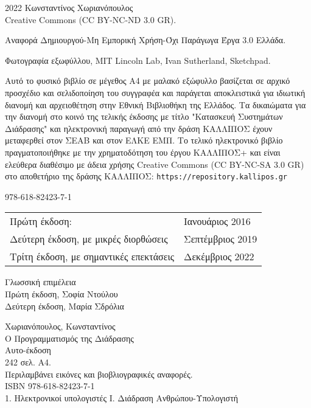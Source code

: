 \thispagestyle{empty}
\begingroup
\footnotesize
\parindent 0pt
\parskip \baselineskip
\textcopyright{} 2022 Κωνσταντίνος Χωριανόπουλος\\
Creative Commons (CC BY-NC-ND 3.0 GR).

Αναφορά Δημιουργού-Μη Εμπορική Χρήση-Όχι Παράγωγα Έργα 3.0 Ελλάδα. 

Φωτογραφία εξωφύλλου, MIT Lincoln Lab, Ivan Sutherland, Sketchpad.

\vfill

Αυτό το φυσικό βιβλίο σε μέγεθος Α4 με μαλακό εξώφυλλο βασίζεται σε αρχικό προσχέδιο και σελιδοποίηση του συγγραφέα και παράγεται αποκλειστικά για ιδιωτική διανομή και αρχειοθέτηση στην Εθνική Βιβλιοθήκη της Ελλάδος. Τα δικαιώματα για την διανομή στο κοινό της τελικής έκδοσης με τίτλο "Κατασκευή Συστημάτων Διάδρασης" και ηλεκτρονική παραγωγή από την δράση ΚΑΛΛΙΠΟΣ έχουν μεταφερθεί στον ΣΕΑΒ και στον ΕΛΚΕ ΕΜΠ. Το τελικό ηλεκτρονικό βιβλίο πραγματοποιήθηκε με την χρηματοδότηση του έργου ΚΑΛΛΙΠΟΣ+ και είναι ελεύθερα διαθέσιμο με άδεια χρήσης Creative Commons (CC BY-NC-SA 3.0 GR) στο αποθετήριο της δράσης ΚΑΛΛΙΠΟΣ: \texttt{https://repository.kallipos.gr} 

\vfill

\begin{center}
978-618-82423-7-1
\end{center}

\begin{center}
\begin{tabular}{ll}
Πρώτη έκδοση: & Ιανουάριος 2016 \\
Δεύτερη έκδοση, με μικρές διορθώσεις & Σεπτέμβριος 2019 \\
Τρίτη έκδοση, με σημαντικές επεκτάσεις & Δεκέμβριος 2022 
\end{tabular}
\end{center}

\vfill

Γλωσσική επιμέλεια \\
\hspace*{2em} Πρώτη έκδοση, Σοφία Ντούλου \\
\hspace*{2em} Δεύτερη έκδοση, Μαρία Σδρόλια \\

\vfill

Χωριανόπουλος, Κωνσταντίνος\\
\hspace*{2em} Ο Προγραμματισμός της Διάδρασης \\
\hspace*{2em} Αυτο-έκδοση \\
\hspace*{2em} 242 σελ. \hspace*{2em} Α4. \\
\hspace*{2em} Περιλαμβάνει εικόνες και βιοβλιογραφικές αναφορές. \\
\hspace*{2em} ISBN 978-618-82423-7-1 \\
\hspace*{2em} 1. Ηλεκτρονικοί υπολογιστές \hspace*{2em} I. Διάδραση Ανθρώπου-Υπολογιστή 



